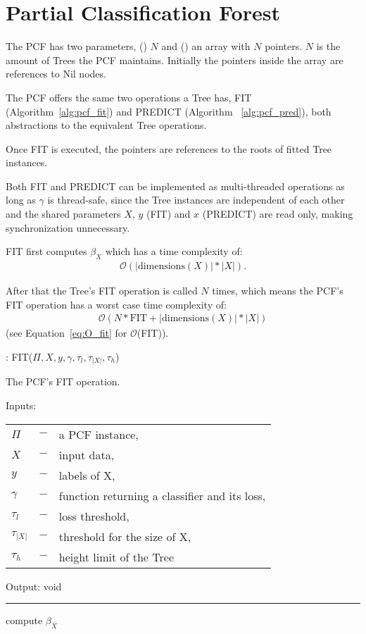 \section{Partial Classification Forest}
\label{sec:pcf}

The PCF has two parameters, () $N$ and
() an array with $N$ pointers.
$N$ is the amount of Trees the PCF maintains.
Initially the pointers inside the array are references to
Nil nodes.

The PCF offers the same two operations a Tree has, FIT
(Algorithm~\ref{alg:pcf_fit}) and PREDICT (Algorithm~%
\ref{alg:pcf_pred}), both abstractions to the equivalent
Tree operations.

Once FIT is executed, the pointers are references to the
roots of fitted Tree instances.

Both FIT and PREDICT can be implemented as multi-threaded
operations as long as $\gamma$ is thread-safe, since the
Tree instances are independent of each other and the shared
parameters $X$, $y$ (FIT) and $x$ (PREDICT) are read only,
making synchronization unnecessary.

FIT first computes $\beta_X$ which has a time complexity
of:
\begin{align}
  \mathcal{O}(|\text{dimensions}(X)| * |X|).
\end{align}

After that the Tree's FIT operation is called $N$ times,
which means the PCF's FIT operation has a worst case time
complexity of:
\begin{align}
  \mathcal{O} (N * \text{FIT} + |\text{dimensions}(X)|*|X|)
\end{align}
(see Equation~\ref{eq:O_fit} for $\mathcal{O}$(FIT)).

\begin{algorithm}
  \caption{: FIT($\Pi, X, y, \gamma, \tau_{l},
    \tau_{|X|}, \tau_{h}$)}%
  \label{alg:pcf_fit}
  The PCF's FIT operation.

  Inputs:

    \begin{tabu}{llX}
    $\Pi$ &$-$ &a PCF instance,\\
    $X$ &$-$ &input data,\\
    $y$ &$-$ &labels of X,\\
    $\gamma$ &$-$ &function returning a classifier and its
      loss,\\
    $\tau_{l}$ &$-$ &loss threshold,\\
    $\tau_{|X|}$ &$-$ &threshold for the size of X,\\
    $\tau_{h}$ &$-$ &height limit of the Tree
    \end{tabu}

  Output: void

  \noindent\rule{\linewidth}{0.4pt}

  \begin{algorithmic}[1]
    \STATE compute $\beta_X$
    \ENDFOR
  \end{algorithmic}
\end{algorithm}

